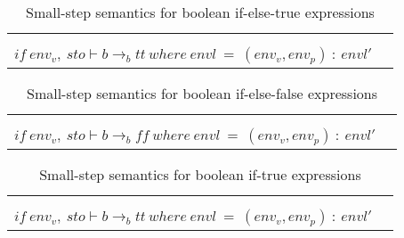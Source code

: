         
\begin{table}[H]
    \centering
    \begin{longtable}[c] { r c }
    
    \begin{tabular}{@{}c@{}} 
    [IF-ELSE-TRUE] \\
    \newline
    \end{tabular}
  \begin{tabular}{@{}c@{}}   \(
  \langle if \ {b} \ then \ {S_1} \ else \ {S_2} \ sto, envl\rangle \Rightarrow \langle{S_1},sto,envl\rangle
  \)  \\ \(
  if \ env_v, \ sto \vdash b \rightarrow_b {tt} \ where \ envl \ = \ (env_v, env_p) \ : \ envl' 
  \) 
  \end{tabular}
        
 \end{longtable}
    \caption{Small-step semantics for boolean if-else-true expressions}\label{sem:if-else-true}
\end{table}

\begin{table}[H]
    \centering
    \begin{longtable}[c] { r c }
    
    \begin{tabular}{@{}c@{}} 
    [IF-ELSE-FALSE] \\
    \newline
    \end{tabular}
  \begin{tabular}{@{}c@{}}   \(
  \langle if \ {b} \ then \ {S_1} \ else \ {S_2} \ sto, envl\rangle \Rightarrow \langle{S_2},sto,envl\rangle
  \)  \\ \(
  if \ env_v, \ sto \vdash b \rightarrow_b {ff} \ where \ envl \ = \ (env_v, env_p) \ : \ envl' 
  \) 
  \end{tabular}
        
 \end{longtable}
    \caption{Small-step semantics for boolean if-else-false expressions}\label{sem:if-else-false}
\end{table}

\begin{table}[H]
    \centering
    \begin{longtable}[c] { r c }
    
    \begin{tabular}{@{}c@{}} 
    [IF-TRUE] \\
    \newline
    \end{tabular}
  \begin{tabular}{@{}c@{}}   \(
  \langle if \ {b} \ then \ {S_1} \ sto, envl\rangle \Rightarrow \langle{S_1},sto,envl\rangle
  \)  \\ \(
  if \ env_v, \ sto \vdash b \rightarrow_b {tt} \ where \ envl \ = \ (env_v, env_p) \ : \ envl' 
  \) 
  \end{tabular}
        
 \end{longtable}
    \caption{Small-step semantics for boolean if-true expressions}\label{sem:if-true}
\end{table}

